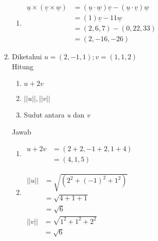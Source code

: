 \documentclass[a4paper,12pt]{article}
\begin{document}
\begin{enumerate}
\begin{enumerate}[label= (\alph*)]
         \item
         $
         \begin{aligned}
             \underline{u} \times (\underline{v} \times \underline{w})
             &= (\underline{u} \cdot \underline{w})\underline{v} - (\underline{u} \cdot \underline{v})\underline{w} \\
             &= (1)\underline{v} - 11\underline{w} \\
             &= (2, 6, 7) - (0, 22, 33) \\
             &= (2, -16, -26)
         \end{aligned}
         $\\[4ex]
      \end{enumerate}

      \item 
      Diketahui $u = (2, -1, 1) ; v = (1, 1, 2)$\\
      Hitung
      \begin{enumerate}[label=\alph*.]
        \item $u + 2v$
        \item $||u|| , ||v||$
        \item Sudut antara \textit{u} dan \textit{v}\\[4ex]
      \end{enumerate}


      Jawab
      \begin{enumerate}[label=(\alph*)]
        \item
        $
        \begin{aligned}
           u + 2v
           &= (2 + 2, -1 + 2, 1 + 4) \\
           &= (4, 1, 5)
        \end{aligned}
        $\\[2ex]

        \item 
        $
        \begin{aligned}
           ||u||
           &= \sqrt{(2^{2} + (-1)^{2} + 1^{2})} \\
           &= \sqrt{4 + 1 + 1} \\
           &= \sqrt{6}
        \end{aligned}
        $\\[2ex]

        $
        \begin{aligned}
           ||v||
           &= \sqrt{1^{2} + 1^{2} + 2^{2}} \\
           &= \sqrt{6}
        \end{aligned}
        $\\[2ex]


\end{enumerate}
\end{enumerate}
\end{document}
